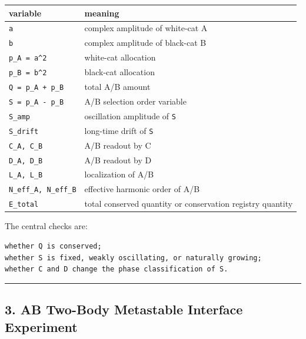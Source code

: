 \documentclass{article}
\newcounter{none}
\begin{document}
{\def\LTcaptype{none} %
\begin{longtable}[]{@{}
  >{\raggedright\arraybackslash}p{}
  >{\raggedright\arraybackslash}p{}@{}}
\toprule\noalign{}
\begin{minipage}[b]{\linewidth}\raggedright
variable
\end{minipage} & \begin{minipage}[b]{\linewidth}\raggedright
meaning
\end{minipage} \\
\midrule\noalign{}
\endhead
\bottomrule\noalign{}
\endlastfoot
\texttt{a} & complex amplitude of white-cat A \\
\texttt{b} & complex amplitude of black-cat B \\
\texttt{p\_A\ =\ \textbar{}a\textbar{}\^{}2} & white-cat allocation \\
\texttt{p\_B\ =\ \textbar{}b\textbar{}\^{}2} & black-cat allocation \\
\texttt{Q\ =\ p\_A\ +\ p\_B} & total A/B amount \\
\texttt{S\ =\ p\_A\ -\ p\_B} & A/B selection order variable \\
\texttt{S\_amp} & oscillation amplitude of \texttt{S} \\
\texttt{S\_drift} & long-time drift of \texttt{S} \\
\texttt{C\_A,\ C\_B} & A/B readout by C \\
\texttt{D\_A,\ D\_B} & A/B readout by D \\
\texttt{L\_A,\ L\_B} & localization of A/B \\
\texttt{N\_eff\_A,\ N\_eff\_B} & effective harmonic order of A/B \\
\texttt{E\_total} & total conserved quantity or conservation registry
quantity \\
\end{longtable}
}

The central checks are:

\begin{verbatim}
whether Q is conserved;
whether S is fixed, weakly oscillating, or naturally growing;
whether C and D change the phase classification of S.
\end{verbatim}

\begin{center}\rule{0.5\linewidth}{0.5pt}\end{center}

\subsection{3. AB Two-Body Metastable Interface
Experiment}\label{ab-two-body-metastable-interface-experiment}
\end{document}
